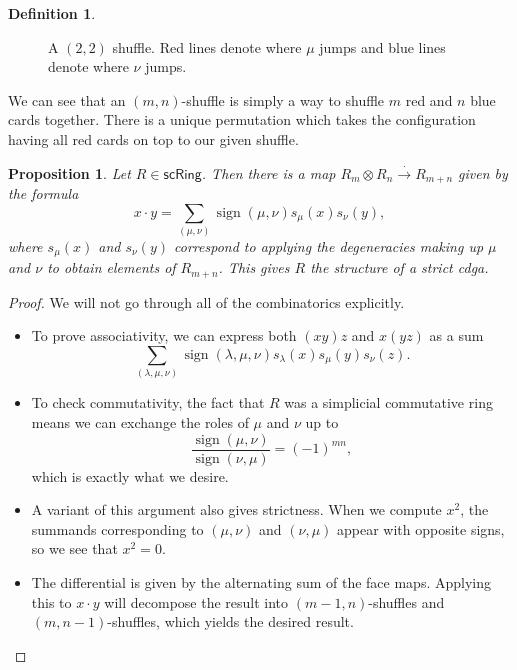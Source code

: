 \documentclass[10pt, oneside]{memoir}
\newtheorem{prop}[thm]{Proposition}
\theoremstyle{definition}
\newtheorem{defn}[thm]{Definition}
\theoremstyle{remark}
\theoremstyle{plain}
\theoremstyle{definition}
\theoremstyle{remark}
\newcommand{\on}[1]{\operatorname{#1}}
\newcommand{\ms}[1]{\mathsf{#1}}
\newcommand{\1}{\mathbf{1}}
\newcommand{\2}{\mathbf{2}}
\newcommand{\3}{\mathbf{3}}
\begin{document}
\begin{defn}
\begin{itemize}
\begin{figure}[htpb]
\begin{center}
        \end{center}
        \caption{A \((2,2) \) shuffle. Red lines denote where \(\mu \) jumps and blue lines denote where \(\nu \) jumps.}%
        \label{fig:22shuffle}
        \end{figure}
        We can see that an \((m,n) \)-shuffle is simply a way to shuffle \(m \) red and \(n \) blue cards together. There is a unique permutation which takes the configuration having all red cards on top to our given shuffle.
    \end{itemize}
\end{defn}

\begin{prop}
    Let \(R \in \ms{scRing} \). Then there is a map \(R_m \otimes R_n \xrightarrow{\cdot} R_{m+n} \) given by the formula
    \[ x \cdot y = \sum_{(\mu, \nu)} \on{sign}(\mu, \nu) s_{\mu}(x) s_{\nu}(y), \]
    where \(s_{\mu}(x) \) and \(s_{\nu}(y) \) correspond to applying the degeneracies making up \(\mu \) and \(\nu \) to obtain elements of \(R_{m+n} \). This gives \(R \) the structure of a strict cdga.
\end{prop}

\begin{proof}
    We will not go through all of the combinatorics explicitly.
    \begin{itemize}
        \item To prove associativity, we can express both \((xy)z \) and \(x(yz) \) as a sum
        \[ \sum_{(\lambda,\mu, \nu)}\on{sign}(\lambda, \mu, \nu) s_{\lambda}(x) s_{\mu}(y) s_{\nu}(z). \]
        \item To check commutativity, the fact that \(R \) was a simplicial commutative ring means we can exchange the roles of \(\mu \) and \(\nu \) up to 
        \[ \frac{\on{sign}(\mu, \nu)}{\on{sign}(\nu, \mu)} = (-1)^{mn}, \]
        which is exactly what we desire.
        \item A variant of this argument also gives strictness. When we compute \(x^2 \), the summands corresponding to \((\mu, \nu) \) and \((\nu, \mu) \) appear with opposite signs, so we see that \(x^2 = 0 \).
        \item The differential is given by the alternating sum of the face maps. Applying this to \(x \cdot y \) will decompose the result into \((m-1, n) \)-shuffles and \((m, n-1) \)-shuffles, which yields the desired result. \qedhere
    \end{itemize}
\end{proof}
\end{document}
